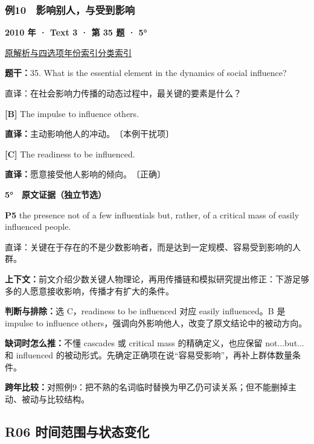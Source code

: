 \documentclass[11pt,a4paper]{article}
\begin{document}
\subsubsection{例10　影响别人，与受到影响}\label{case-2010-T3-Q35}
\noindent\textbf{2010 年 · Text 3 · 第 35 题 · 5°}\par\noindent \href{https://zj139.github.io/math-notes/english/2d3d87506df0a87664eef64d/\#q35}{原解析与四选项}\quad \hyperref[idx-2010-T3-Q35]{年份索引}\quad \hyperref[class-R05]{分类索引}\par\smallskip
\noindent\textbf{题干：}35. What is the essential element in the dynamics of social influence?\par
直译：在社会影响力传播的动态过程中，最关键的要素是什么？\par
{}\noindent\textbf{[B]} The impulse to influence others.\par\nopagebreak
\noindent\textbf{直译：}主动影响他人的冲动。　〔本例干扰项〕\par
{}\noindent\textbf{[C]} The readiness to be influenced.\par\nopagebreak
\noindent\textbf{直译：}愿意接受他人影响的倾向。　〔正确〕\par
\begin{evidence}\textbf{5°　原文证据（独立节选）}\par
\textbf{P5} the presence not of a few influentials but, rather, of a critical mass of easily influenced people.\par 直译：关键在于存在的不是少数影响者，而是达到一定规模、容易受到影响的人群。\par
\end{evidence}
\noindent\textbf{上下文：}前文介绍少数关键人物理论，再用传播链和模拟研究提出修正：下游足够多的人愿意接收影响，传播才有扩大的条件。\par
\noindent\textbf{判断与排除：}选 C，readiness to be influenced 对应 easily influenced。B 是 impulse to influence others，强调向外影响他人，改变了原文结论中的被动方向。\par
\noindent\textbf{缺词时怎么推：}不懂 cascades 或 critical mass 的精确定义，也应保留 not...but... 和 influenced 的被动形式。先确定正确项在说“容易受影响”，再补上群体数量条件。\par
\noindent\textbf{跨年比较：}对照例9：把不熟的名词临时替换为甲乙仍可读关系；但不能删掉主动、被动与比较结构。\par
\clearpage
\subsection{R06 时间范围与状态变化}
\end{document}
